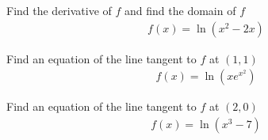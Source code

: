 \begin{exercise}
Find the derivative of $f$ and find the domain of $f$
\begin{align*}
    f(x) = \ln (x^{2} - 2x)
\end{align*}
\end{exercise}

\begin{exercise}
Find an equation of the line tangent to $f$ at $(1, 1)$
\begin{align*}
    f(x) = \ln (xe^{x^{2}})
\end{align*}
\end{exercise}

\begin{exercise}
Find an equation of the line tangent to $f$ at $(2, 0)$
\begin{align*}
    f(x) = \ln(x^{3} - 7)
\end{align*}
\end{exercise}

